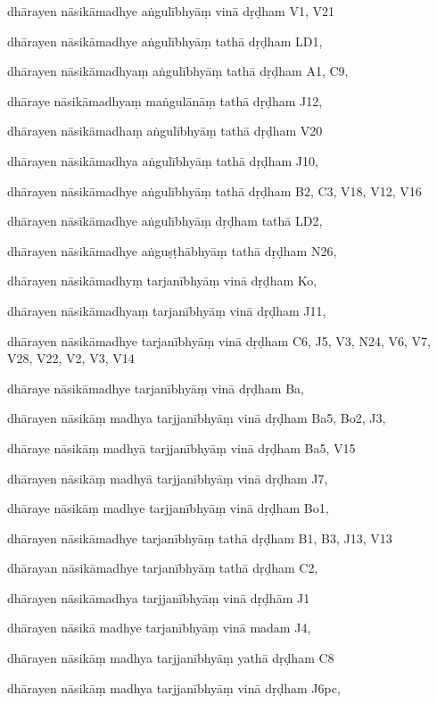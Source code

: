 \begin{ekdosis}
\begin{marma}[hp01_055]
\begin{marma}[hp02_009]
\begin{marma}[hp02_011]
      \begin{marma}[hp02_65cd]
      \item[dhārayen nāsikāmadhye aṅgulībhyāṃ vinā dṛḍham] V1, V21
      \item[dhārayen nāsikāmadhye aṅgulībhyāṃ tathā dṛḍham] LD1,
      \item[dhārayen nāsikāmadhyaṃ aṅgulībhyāṃ tathā dṛḍham] A1, C9, 
      \item[dhāraye nāsikāmadhyaṃ maṅgulānāṃ tathā dṛḍham] J12,
      \item[dhārayen nāsikāmadhaṃ aṅgulībhyāṃ tathā dṛḍham] V20
      \item[dhārayen nāsikāmadhya aṅgulībhyāṃ tathā dṛḍham] J10,
      \item[dhārayen nāsikāmadhye aṅgulībhyāṃ tathā dṛḍham] B2, C3, V18, V12, V16
      \item[dhārayen nāsīkāmadhye aṅgulībhyāṃ dṛḍham tathā] LD2,
      \item[dhārayen nāsikāmadhye aṅguṣṭhābhyāṃ tathā dṛḍham] N26,
      \item[dhārayen nāsikāmadhyṃ tarjanībhyāṃ vinā dṛḍham] Ko,
      \item[dhārayen nāsikāmadhyaṃ tarjanībhyāṃ vinā dṛḍham] J11,
      \item[dhārayen nāsikāmadhye tarjanībhyāṃ vinā dṛḍham] C6, J5, V3, N24, V6, V7, V28, V22, V2, V3, V14
      \item[dhāraye nāsikāmadhye tarjanībhyāṃ vinā dṛḍham] Ba,
      \item[dhārayen nāsikāṃ madhya tarjjanībhyāṃ vinā dṛḍham] Ba5, Bo2, J3,
      \item[dhāraye nāsikāṃ madhyā tarjjanībhyāṃ vinā dṛḍham] Ba5, V15
      \item[dhārayen nāsikāṃ madhyā tarjjanībhyāṃ vinā dṛḍham] J7,
      \item[dhāraye nāsikāṃ madhye tarjjanībhyāṃ vinā dṛḍham] Bo1,
      \item[dhārayen nāsikāmadhye tarjanībhyāṃ tathā dṛḍham] B1, B3, J13, V13
      \item[dhārayan nāsikāmadhye tarjanībhyāṃ tathā dṛḍham] C2, 
      \item[dhārayen nāsikāmadhya tarjjanībhyāṃ vinā dṛḍhām] J1
      \item[dhārayen nāsikā madhye tarjanībhyāṃ vinā madam] J4,
      \item[dhārayen nāsikāṃ madhya tarjjanībhyāṃ yathā dṛḍham] C8
      \item[dhārayen nāsikāṃ madhya tarjjanībhyāṃ vinā dṛḍham] J6pc,

\end{marma}
\end{marma}
\end{marma}
\end{marma}
\end{ekdosis}
